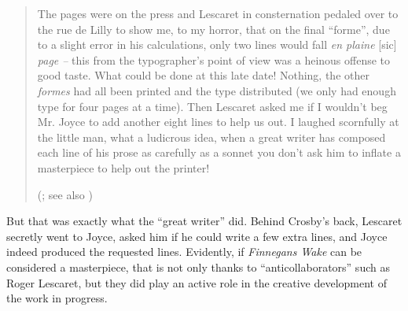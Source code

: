 \begin{paper}
\begin{quote}
The pages were on the press and Lescaret in consternation pedaled over
to the rue de Lilly to show me, to my horror, that on the final ``forme'',
due to a slight error in his calculations, only two lines would fall
\emph{en plaine} {[}sic{]} \emph{page --} this from the typographer's
point of view was a heinous offense to good taste. What could be done at
this late date! Nothing, the other \emph{formes} had all been printed
and the type distributed (we only had enough type for four pages at a
time). Then Lescaret asked me if I wouldn't beg Mr. Joyce to add another
eight lines to help us out. I laughed scornfully at the little man, what
a ludicrous idea, when a great writer has composed each line of his
prose as carefully as a sonnet you don't ask him to inflate a
masterpiece to help out the printer! 
\begin{flushright}
(\citealt[187]{crosby_passionate_1953}; see also \citealt[614--15]{ellmann_james_1983})
\end{flushright}
\end{quote}

\newpage
\noindent But that was exactly what the ``great writer'' did. Behind Crosby's
back, Lescaret secretly went to Joyce, asked him if he could write a few
extra lines, and Joyce indeed produced the requested lines. Evidently,
if \emph{Finnegans Wake} can be considered a masterpiece, that is not
only thanks to ``anticollaborators'' such as Roger Lescaret, but they
did play an active role in the creative development of the work in
progress.


\end{paper}
